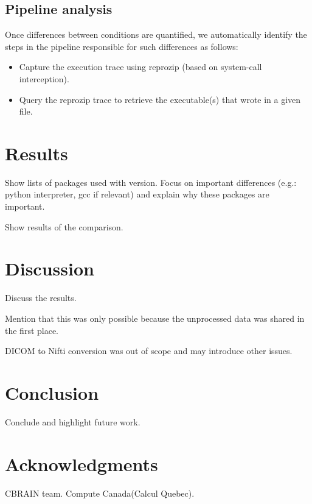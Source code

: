 \documentclass{article}
\begin{document}
\subsection{Pipeline analysis}

Once differences between conditions are quantified, we automatically identify the steps in the pipeline responsible for such differences as follows:
\begin{itemize}
\item Capture the execution trace using reprozip (based on system-call interception).
\item Query the reprozip trace to retrieve the executable(s) that wrote in a given file.
\end{itemize}


\section{Results}

Show lists of packages used with version. Focus on important
differences (e.g.: python interpreter, gcc if relevant) and explain
why these packages are important.

Show results of the comparison.

\section{Discussion}

Discuss the results.

Mention that this was only possible because the unprocessed data was shared in the first place.

DICOM to Nifti conversion was out of scope and may introduce other issues.

\section{Conclusion}

Conclude and highlight future work.

\section{Acknowledgments}

CBRAIN team. Compute Canada(Calcul Quebec).



\end{document}
